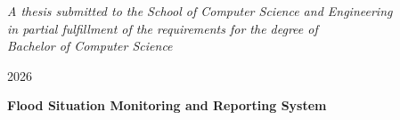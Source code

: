 \documentclass[12pt, twoside]{report}
\begin{document}
\begin{titlepage}
	\vspace{3.5cm}
	\textit{A thesis submitted to the School of Computer Science and Engineering \\ in partial
		fulfillment of the requirements for the degree of \\ Bachelor of Computer Science}
														
	\vspace{3.5cm}
	 \par 2026
														
	\newpage
													
	\centering
	\textbf{\large Flood Situation Monitoring and Reporting System}\par
	\vspace{4cm}

        \centering
	\hspace{7cm}
	\par
	\vspace{2cm}

        \centering
	\hspace{7cm}
	\makebox[7cm][l]{\underline{\hspace{7cm}}}
	\par \hspace{7cm}
	\vspace{2cm}

        \centering
	\hspace{7cm}
        \vspace{2cm}

        \centering
	\hspace{7cm}
	\makebox[7cm][l]{\underline{\hspace{7cm}}}
	\par \hspace{7cm}
	\par
	\vspace{2cm}

        \centering
        \hspace{7cm}
	\makebox[7cm][l]{\underline{\hspace{7cm}}}
	\par \hspace{7cm}
	\par
	\vspace{2cm}

	\par
	\thispagestyle{empty}
\end{titlepage}
\restoregeometry
	
\end{document}
